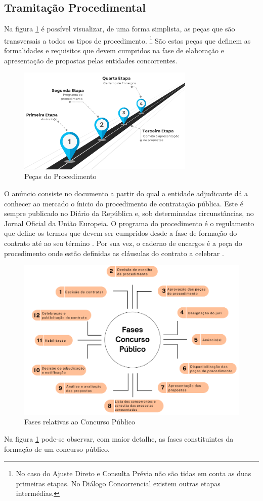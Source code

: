 \subsection{Tramitação Procedimental}

Na figura \ref{fig:pecas} é possível visualizar, de uma forma simplista, as peças que são transversais a todos os tipos de procedimento. \footnote{No caso do Ajuste Direto e Consulta Prévia não são tidas em conta as duas primeiras etapas. No Diálogo Concorrencial existem outras etapas intermédias.} 
São estas peças que definem as formalidades e requisitos que devem cumpridos na fase de elaboração e apresentação de propostas pelas entidades concorrentes. 

\begin{figure}[H]
	\centering
	\includegraphics[width=0.75\textwidth]{imagens/pecasprocedimento.png}
	\caption{Peças do Procedimento}
	\label{fig:pecas}
\end{figure}


O anúncio consiste no documento a partir do qual a entidade adjudicante dá a conhecer ao mercado o ínicio do procedimento de contratação pública. Este é sempre publicado no Diário da República e, sob determinadas circunstâncias, no Jornal Oficial da União Europeia. 
O programa do procedimento é o regulamento que define os termos que devem ser cumpridos desde a fase de formação do contrato até ao seu término \cite{programaproc}. 
Por sua vez, o caderno de encargos é a peça do procedimento onde estão definidas as cláusulas do contrato a celebrar \cite{caderno}. 


\begin{figure}[H]
	\centering
	\includegraphics[width=.8\textwidth]{imagens/fasesconcpub.png}
	\caption{Fases relativas ao Concurso Público}
	\label{fig:fasescp}
\end{figure}

Na figura \ref{fig:pecas} pode-se observar, com maior detalhe, as fases constituintes da formação de um concurso público. 

